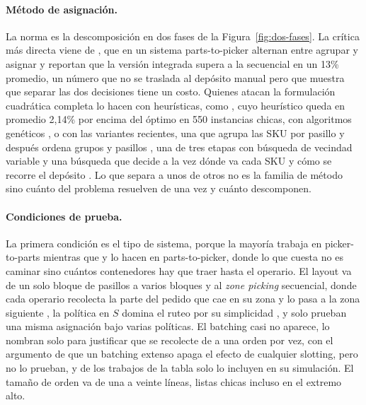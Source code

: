 \paragraph{Método de asignación.}
La norma es la descomposición en dos fases de la Figura~\ref{fig:dos-fases}.
La crítica más directa viene de \citet{mirzaei2021integrated}, que en un sistema parts-to-picker alternan entre agrupar y asignar y reportan que la versión integrada supera a la secuencial en un 13\% promedio, un número que no se traslada al depósito manual pero que muestra que separar las dos decisiones tiene un costo.
Quienes atacan la formulación cuadrática completa lo hacen con heurísticas, como \citet{mantel2007order}, cuyo heurístico queda en promedio 2,14\% por encima del óptimo en 550 instancias chicas, con algoritmos genéticos \citep{li2015dynamic, guan2018genetic}, o con las variantes recientes, una que agrupa las SKU por pasillo y después ordena grupos y pasillos \citep{islam2024heuristic}, una de tres etapas con búsqueda de vecindad variable \citep{debold2025storage} y una búsqueda que decide a la vez dónde va cada SKU y cómo se recorre el depósito \citep{chen2026integrated}.
Lo que separa a unos de otros no es la familia de método sino cuánto del problema resuelven de una vez y cuánto descomponen.

\paragraph{Condiciones de prueba.}
La primera condición es el tipo de sistema, porque la mayoría trabaja en picker-to-parts mientras que \citet{mirzaei2021integrated} y \citet{guan2018genetic} lo hacen en parts-to-picker, donde lo que cuesta no es caminar sino cuántos contenedores hay que traer hasta el operario.
El layout va de un solo bloque de pasillos \citep{zhang2016correlated} a varios bloques \citep{islam2024heuristic} y al \emph{zone picking} secuencial, donde cada operario recolecta la parte del pedido que cae en su zona y lo pasa a la zona siguiente \citep{debold2025storage}, la política en $S$ domina el ruteo por su simplicidad \citep{islam2023cslap}, y solo \citet{chen2026integrated} prueban una misma asignación bajo varias políticas.
El batching casi no aparece, \citet{mantel2007order} lo nombran solo para justificar que se recolecte de a una orden por vez, con el argumento de que un batching extenso apaga el efecto de cualquier slotting, pero no lo prueban, y de los trabajos de la tabla solo \citet{benaglia2024cold} lo incluyen en su simulación.
El tamaño de orden va de una a veinte líneas, listas chicas incluso en el extremo alto.


